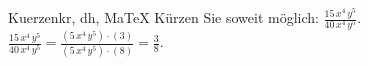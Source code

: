 \begin{MAufgabe}{Kuerzen}{kr, dh, MaTeX}
K\"urzen Sie soweit m\"oglich: $\frac{15\, x^4\, y^5}{40\, x^4\, y^5}$.\\ 
\ifLsg\MLoesung
\quad $\frac{15\, x^4\, y^5}{40\, x^4\, y^5}=\frac{(5\, x^4\, y^5)\cdot(3)}{(5\, x^4\, y^5)\cdot(8)}=\frac{3}{8}$.\else\relax\fi
 \end{MAufgabe}